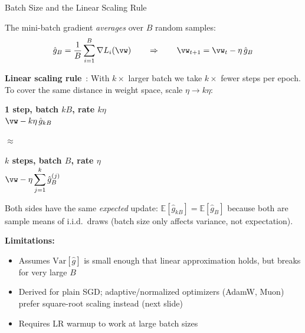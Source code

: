 \begin{frame}{Batch Size and the Linear Scaling Rule}

  The mini-batch gradient \emph{averages} over $B$ random samples:
  \[
    \hat{g}_B = \frac{1}{B} \sum_{i=1}^{B} \nabla L_i(\vw) \qquad \Rightarrow \qquad \vw_{t+1} = \vw_t - \eta\, \hat{g}_B
  \]

  \vspace{0.2em}
  \textbf{Linear scaling rule}~\cite{goyal2017accurate}: With $k\times$ larger batch we take $k\times$ fewer steps per epoch. To cover the same distance in weight space, scale $\eta \to k\eta$:

  \medskip
  \begin{center}
  \begin{minipage}[c]{0.42\textwidth}
  \begin{tcolorbox}[colback=slide_blue!30, colframe=slide_blue!80, boxrule=0.6pt, arc=3pt, left=6pt, right=6pt, top=4pt, bottom=4pt]
    \centering
    {\small\textbf{1 step, batch $kB$, rate $k\eta$}}\\[4pt]
    $\vw - k\eta\, \hat{g}_{kB}$
  \end{tcolorbox}
  \end{minipage}%
  \hfill
  \begin{minipage}[c]{0.06\textwidth}
    \centering $\approx$
  \end{minipage}%
  \hfill
  \begin{minipage}[c]{0.42\textwidth}
  \begin{tcolorbox}[colback=slide_beige!30, colframe=slide_beige!80, boxrule=0.6pt, arc=3pt, left=6pt, right=6pt, top=4pt, bottom=4pt]
    \centering
    {\small\textbf{$k$ steps, batch $B$, rate $\eta$}}\\[4pt]
    $\vw - \eta \displaystyle\sum_{j=1}^{k} \hat{g}_{B}^{(j)}$
  \end{tcolorbox}
  \end{minipage}
  \end{center}
  Both sides have the same \emph{expected} update: $\mathbb{E}[\hat{g}_{kB}] = \mathbb{E}[\hat{g}_B]$ because both are sample means of i.i.d.\ draws (batch size only affects variance, not expectation).

  \vspace{0.3em}
  \textbf{Limitations:}
  \begin{itemize}
    \item Assumes $\text{Var}[\hat{g}]$ is small enough that linear approximation holds, but breaks for very large $B$
    \item Derived for plain SGD; adaptive/normalized optimizers (AdamW, Muon) prefer square-root scaling instead (next slide)
    \item Requires LR warmup to work at large batch sizes
  \end{itemize}

\end{frame}

